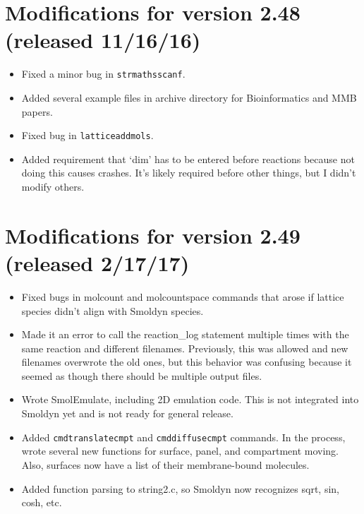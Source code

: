 \documentclass {scrbook}
\newcommand {\ttt} {\texttt}
\begin{document}
\section{Modifications for version 2.48 (released 11/16/16)}
\begin{itemize}
\item Fixed a minor bug in \ttt{strmathsscanf}.
\item Added several example files in archive directory for Bioinformatics and MMB papers.
\item Fixed bug in \ttt{latticeaddmols}.
\item Added requirement that `dim' has to be entered before reactions because not doing this causes crashes. It's likely required before other things, but I didn't modify others.
\end{itemize}

\section{Modifications for version 2.49 (released 2/17/17)}
\begin{itemize}
\item Fixed bugs in molcount and molcountspace commands that arose if lattice species didn't align with Smoldyn species.
\item Made it an error to call the reaction\_log statement multiple times with the same reaction and different filenames. Previously, this was allowed and new filenames overwrote the old ones, but this behavior was confusing because it seemed as though there should be multiple output files.
\item Wrote SmolEmulate, including 2D emulation code. This is not integrated into Smoldyn yet and is not ready for general release.
\item Added \ttt{cmdtranslatecmpt} and \ttt{cmddiffusecmpt} commands. In the process, wrote several new functions for surface, panel, and compartment moving. Also, surfaces now have a list of their membrane-bound molecules.
\item Added function parsing to string2.c, so Smoldyn now recognizes sqrt, sin, cosh, etc.
\end{itemize}
\end{document}
